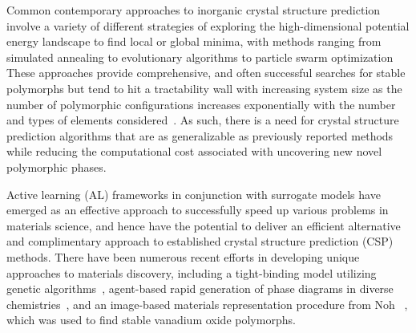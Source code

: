%
%
%
Common contemporary approaches to inorganic crystal structure prediction involve a variety of different strategies of exploring the high-dimensional potential energy landscape to find local or global minima,
with methods ranging from simulated annealing to evolutionary algorithms to particle swarm optimization
\cite{Oganov2006,Lyakhov2010,Glass2006,Wang2012,Pickard2011,Pickard2006,Avery2019,Lonie2011}
%
These approaches provide comprehensive,
and often successful searches for stable polymorphs but tend to hit a tractability wall with increasing system size as the number of polymorphic configurations increases exponentially with the number and types of elements considered~\cite{Stillinger1999}.
%
As such, there is a need for crystal structure prediction algorithms that are as generalizable as previously reported methods while reducing the computational cost associated with uncovering new novel polymorphic phases.


%
%
Active learning (AL) frameworks in conjunction with surrogate models have emerged as an effective approach to successfully speed up various problems in materials science,
and hence have the potential to deliver an efficient alternative and complimentary approach to established crystal structure prediction (CSP) methods.
\cite{hansen2019atomistic,torres2019low,Jennings2019,podryabinkin2017active,Bassman2018}
%
There have been numerous recent efforts in developing unique approaches to materials discovery,
including a tight-binding model utilizing genetic algorithms~\cite{VanDenBossche2018},
agent-based rapid generation of phase diagrams in diverse chemistries~\cite{Montoya2020},
and an image-based materials representation procedure from Noh ~\cite{noh2019inverse},
which was used to find stable vanadium oxide polymorphs.


